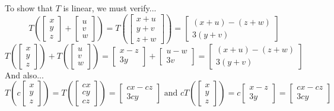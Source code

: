 \begin{applicationActivities}
\begin{example}
To show that \(T\) is linear, we must verify...
\[
  T\left(
    \begin{bmatrix} x \\ y \\ z \end{bmatrix} +
    \begin{bmatrix} u \\ v \\ w \end{bmatrix}
  \right)
=
  T\left(
    \begin{bmatrix} x+u \\ y+v \\ z+w \end{bmatrix}
  \right) =
  \begin{bmatrix} (x+u)-(z+w) \\ 3(y+v) \end{bmatrix}
\]
\[
  T\left(
    \begin{bmatrix} x \\ y \\ z \end{bmatrix}
  \right) + T\left(
    \begin{bmatrix} u \\ v \\ w \end{bmatrix}
  \right)
=
  \begin{bmatrix} x-z \\ 3y \end{bmatrix} +
  \begin{bmatrix} u-w \\ 3v \end{bmatrix}=
  \begin{bmatrix} (x+u)-(z+w) \\ 3(y+v) \end{bmatrix}
\]
And also...
\[
  T\left(c\begin{bmatrix} x \\ y \\ z \end{bmatrix} \right)
=
  T\left(\begin{bmatrix} cx \\ cy \\ cz \end{bmatrix} \right)
=
  \begin{bmatrix} cx-cz \\ 3cy \end{bmatrix}
\text{ and }
  cT\left(\begin{bmatrix} x \\ y \\ z \end{bmatrix} \right)
=
  c\begin{bmatrix} x-z \\ 3y \end{bmatrix}
=
  \begin{bmatrix} cx-cz \\ 3cy \end{bmatrix}
\]


\end{example}
\end{applicationActivities}
